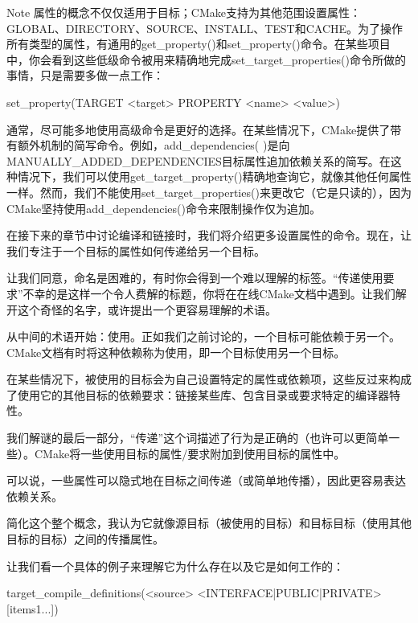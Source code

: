 \begin{myNotic}{Note}
属性的概念不仅仅适用于目标；CMake支持为其他范围设置属性：GLOBAL、DIRECTORY、SOURCE、INSTALL、TEST和CACHE。为了操作所有类型的属性，有通用的get\_property()和set\_property()命令。在某些项目中，你会看到这些低级命令被用来精确地完成set\_target\_properties()命令所做的事情，只是需要多做一点工作：

\begin{shell}
set_property(TARGET <target> PROPERTY <name> <value>)
\end{shell}
\end{myNotic}

通常，尽可能多地使用高级命令是更好的选择。在某些情况下，CMake提供了带有额外机制的简写命令。例如，add\_dependencies( )是向MANUALLY\_ADDED\_DEPENDENCIES目标属性追加依赖关系的简写。在这种情况下，我们可以使用get\_target\_property()精确地查询它，就像其他任何属性一样。然而，我们不能使用set\_target\_properties()来更改它（它是只读的），因为CMake坚持使用add\_dependencies()命令来限制操作仅为追加。

在接下来的章节中讨论编译和链接时，我们将介绍更多设置属性的命令。现在，让我们专注于一个目标的属性如何传递给另一个目标。


让我们同意，命名是困难的，有时你会得到一个难以理解的标签。“传递使用要求”不幸的是这样一个令人费解的标题，你将在在线CMake文档中遇到。让我们解开这个奇怪的名字，或许提出一个更容易理解的术语。

从中间的术语开始：使用。正如我们之前讨论的，一个目标可能依赖于另一个。CMake文档有时将这种依赖称为使用，即一个目标使用另一个目标。

在某些情况下，被使用的目标会为自己设置特定的属性或依赖项，这些反过来构成了使用它的其他目标的依赖要求：链接某些库、包含目录或要求特定的编译器特性。

我们解谜的最后一部分，“传递”这个词描述了行为是正确的（也许可以更简单一些）。CMake将一些使用目标的属性/要求附加到使用目标的属性中。

可以说，一些属性可以隐式地在目标之间传递（或简单地传播），因此更容易表达依赖关系。

简化这个整个概念，我认为它就像源目标（被使用的目标）和目标目标（使用其他目标的目标）之间的传播属性。

让我们看一个具体的例子来理解它为什么存在以及它是如何工作的：

\begin{shell}
target_compile_definitions(<source> <INTERFACE|PUBLIC|PRIVATE> [items1...])
\end{shell}

